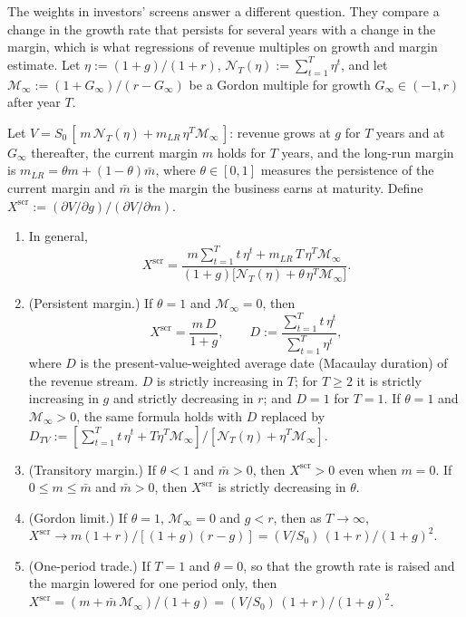 The weights in investors' screens answer a different question. They compare a change in the growth rate that persists for several years with a change in the margin, which is what regressions of revenue multiples on growth and margin estimate. Let $\eta:=(1+g)/(1+r)$, $\mathcal N_T(\eta):=\sum_{t=1}^T\eta^t$, and let $\mathcal M_\infty:=(1+G_\infty)/(r-G_\infty)$ be a Gordon multiple for growth $G_\infty\in(-1,r)$ after year $T$.

\begin{lemma}\label{lem:valuation2}\label{lem:valuation}\label{lem:ruleX}
Let $V=S_0\,[\,m\,\mathcal N_T(\eta)+m_{LR}\,\eta^T\mathcal M_\infty\,]$: revenue grows at $g$ for $T$ years and at $G_\infty$ thereafter, the current margin $m$ holds for $T$ years, and the long-run margin is $m_{LR}=\theta m+(1-\theta)\bar m$, where $\theta\in[0,1]$ measures the persistence of the current margin and $\bar m$ is the margin the business earns at maturity. Define $X^{\mathrm{scr}}:=(\partial V/\partial g)/(\partial V/\partial m)$.
\begin{enumerate}
\item[(a)] In general,
\begin{equation}\label{eq:X2}
X^{\mathrm{scr}}=\frac{m\sum_{t=1}^Tt\,\eta^t+m_{LR}\,T\,\eta^T\mathcal M_\infty}{(1+g)\bigl[\mathcal N_T(\eta)+\theta\,\eta^T\mathcal M_\infty\bigr]} .
\end{equation}
\item[(b)] (Persistent margin.) If $\theta=1$ and $\mathcal M_\infty=0$, then
\begin{equation}\label{eq:XmD}
X^{\mathrm{scr}}=\frac{m\,D}{1+g},\qquad D:=\frac{\sum_{t=1}^Tt\,\eta^t}{\sum_{t=1}^T\eta^t},
\end{equation}
where $D$ is the present-value-weighted average date (Macaulay duration) of the revenue stream. $D$ is strictly increasing in $T$; for $T\ge 2$ it is strictly increasing in $g$ and strictly decreasing in $r$; and $D=1$ for $T=1$. If $\theta=1$ and $\mathcal M_\infty>0$, the same formula holds with $D$ replaced by $D_{TV}:=[\sum_{t=1}^Tt\,\eta^t+T\eta^T\mathcal M_\infty]/[\mathcal N_T(\eta)+\eta^T\mathcal M_\infty]$.
\item[(c)] (Transitory margin.) If $\theta<1$ and $\bar m>0$, then $X^{\mathrm{scr}}>0$ even when $m=0$. If $0\le m\le\bar m$ and $\bar m>0$, then $X^{\mathrm{scr}}$ is strictly decreasing in $\theta$.
\item[(d)] (Gordon limit.) If $\theta=1$, $\mathcal M_\infty=0$ and $g<r$, then as $T\to\infty$, $X^{\mathrm{scr}}\to m(1+r)/[(1+g)(r-g)]=(V/S_0)\,(1+r)/(1+g)^2$.
\item[(e)] (One-period trade.) If $T=1$ and $\theta=0$, so that the growth rate is raised and the margin lowered for one period only, then $X^{\mathrm{scr}}=(m+\bar m\,\mathcal M_\infty)/(1+g)=(V/S_0)\,(1+r)/(1+g)^2$.
\end{enumerate}
\end{lemma}

